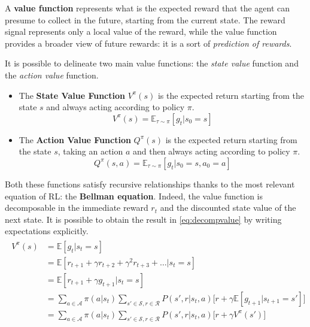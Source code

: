 A \textbf{value function} represents what is the expected reward that the agent can presume to collect in the future, starting from the current state. The reward signal represents only a local value of the reward, while the value function provides a broader view of future rewards: it is a sort of \textit{prediction of rewards}.

It is possible to delineate two main value functions: the \textit{state value} function and the \textit{action value} function.

\begin{itemize}
	\item The \textbf{State Value Function} $V^\pi(s)$ is the expected return starting from the state $s$ and always acting according to policy $\pi$.
	\begin{equation} \label{eq:statevalue}
		V^\pi(s) = \mathbb{E}_{\tau \sim \pi}[g_t | s_0 = s]
	\end{equation}
	\item The \textbf{Action Value Function} $Q^\pi(s)$ is the expected return starting from the state $s$, taking an action $a$ and then always acting according to policy $\pi$.
	\begin{equation} \label{eq:actionvalue}
	Q^\pi(s, a) = \mathbb{E}_{\tau \sim \pi}[g_t | s_0 = s, a_0 = a]
	\end{equation}
\end{itemize}


Both these functions satisfy recursive relationships thanks to the most relevant equation of RL: the \textbf{Bellman equation}. Indeed, the value function is decomposable in the immediate reward $r_t$ and the discounted state value of the next state. It is possible to obtain the result in \vref{eq:decompvalue} by writing expectations explicitly.
\begin{align}\label{eq:decompvalue}
	\begin{split}
	V^\pi(s) &= \mathbb{E}[g_t | s_t = s] \\
	&= \mathbb{E}[r_{t+1} + \gamma r_{t+2} + \gamma^2 r_{t+3} + \dots | s_t = s] \\
	&= \mathbb{E}[r_{t+1} + \gamma g_{t+1} | s_t = s] \\
	&= \sum_{a \in \mathcal{A}}\pi(a|s_t)\sum_{s' \in \mathcal{S}, r \in \mathcal{R}}P(s', r | s_t, a)\big[r + \gamma\mathbb{E}[g_{t+1}| s_{t+1} = s']\big]\\
	&= \sum_{a \in \mathcal{A}}\pi(a|s_t)\sum_{s' \in \mathcal{S}, r \in \mathcal{R}}P(s', r | s_t, a)\big[r + \gamma V^\pi(s')\big]
	\end{split}
\end{align}

